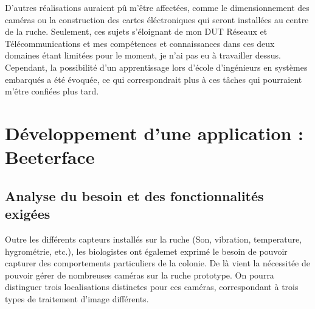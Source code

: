 \documentclass[11pt,french,a4paper]{report}
\begin{document}
D'autres réalisations auraient pû m'être affectées, comme le dimensionnement des caméras ou la construction des cartes éléctroniques
qui seront installées au centre de la ruche. Seulement, ces sujets s'éloignant de mon DUT Réseaux et Télécommunications et mes 
compétences et connaissances dans ces deux domaines étant limitées pour le moment, je n'ai pas eu à travailler dessus.\\

Cependant, la possibilité d'un apprentissage lors d'école d'ingénieurs en systèmes embarqués a été évoquée, ce qui correspondrait 
plus à ces tâches qui pourraient m'être confiées plus tard.


\chapter{Développement d'une application : Beeterface}

    \section{Analyse du besoin et des fonctionnalités exigées}

Outre les différents capteurs installés sur la ruche (Son, vibration, temperature, hygrométrie, etc.), 
les biologistes ont égalemet exprimé le besoin de pouvoir capturer des comportements particuliers de la colonie. 
De là vient la nécessitée de pouvoir gérer de nombreuses caméras sur la ruche prototype. 
On pourra distinguer trois localisations distinctes pour ces caméras, correspondant à trois types de traitement d'image différents. \\
\end{document}
